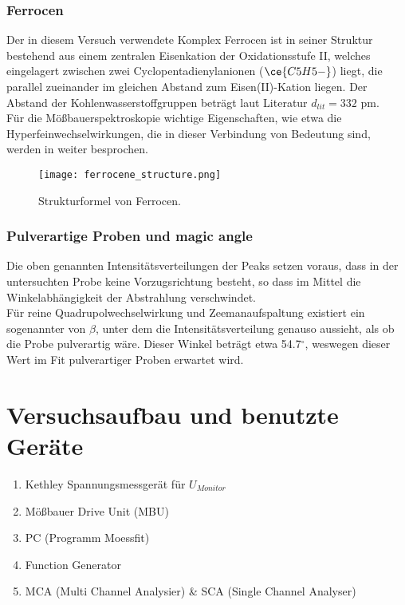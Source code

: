 \documentclass[german,  %
parskip=full,  %
headsepline]{scrartcl}
\newcommand{\bcref}[1]{\namecref{#1} \textcolor{blue}{\labelcref{#1}}}
\begin{document}
\subsubsection{Ferrocen}
Der in diesem Versuch verwendete Komplex Ferrocen ist in seiner Struktur bestehend aus einem zentralen Eisenkation der Oxidationsstufe II, welches eingelagert zwischen zwei Cyclopentadienylanionen ($\ce{C5H5-}$) liegt, die parallel zueinander im gleichen Abstand zum Eisen(II)-Kation liegen.
Der Abstand der Kohlenwasserstoffgruppen beträgt laut Literatur $d_{lit} = 332$ pm.\\
Für die Mößbauerspektroskopie wichtige Eigenschaften, wie etwa die Hyperfeinwechselwirkungen, die in dieser Verbindung von Bedeutung sind, werden in \bcref{ferrocen} weiter besprochen.
\begin{figure}[!htp]
    \centering
    \texttt{[image: ferrocene\_structure.png]}
    \caption{Strukturformel von Ferrocen.}
    \label{fig:ferrocen_struc}
\end{figure}

\subsubsection{Pulverartige Proben und magic angle}
Die oben genannten Intensitätsverteilungen der Peaks setzen voraus, dass in der untersuchten Probe keine Vorzugsrichtung besteht, so dass im Mittel die Winkelabhängigkeit der Abstrahlung verschwindet. \\
Für reine Quadrupolwechselwirkung und Zeemanaufspaltung existiert ein sogenannter  von $\beta$, unter dem die Intensitätsverteilung genauso aussieht, als ob die Probe pulverartig wäre. Dieser Winkel beträgt etwa 54.7$^\circ$, weswegen dieser Wert im Fit pulverartiger Proben erwartet wird.


\section{Versuchsaufbau und benutzte Geräte}
\begin{enumerate}
    \item Kethley Spannungsmessgerät für $U_{Monitor}$
    \item Mößbauer Drive Unit (MBU)
    \item PC (Programm Moessfit)
    \item Function Generator
    \item MCA (Multi Channel Analysier) \& SCA (Single Channel Analyser)
\end{enumerate}
\end{document}
